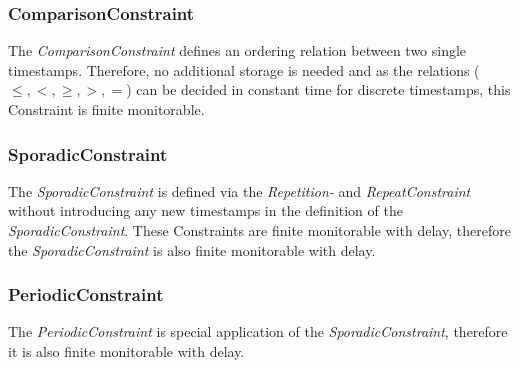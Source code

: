 \subsubsection{ComparisonConstraint}
	The \emph{ComparisonConstraint} defines an ordering relation between two single timestamps. Therefore, no additional storage is needed and as the relations ($\leq, <, \geq, >, =$) can be decided in constant time for discrete timestamps, this Constraint is finite monitorable.
	
\subsubsection{SporadicConstraint}
	The \emph{SporadicConstraint} is defined via the \emph{Repetition-} and \emph{RepeatConstraint} without introducing any new timestamps in the definition of the \emph{SporadicConstraint}. These Constraints are finite monitorable with delay, therefore the \emph{SporadicConstraint} is also finite monitorable with delay.
	
\subsubsection{PeriodicConstraint}
	The \emph{PeriodicConstraint} is special application of the \emph{SporadicConstraint}, therefore it is also finite monitorable with delay.
	
